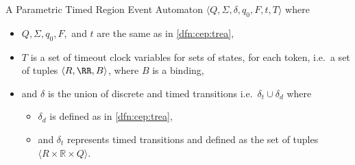 %			
			
			
			\begin{dfn}
				\label{dfn:cep:ptrea}
				A Parametric Timed Region Event Automaton $\langle Q,\Sigma,\delta,q_0, F, t, T \rangle$ where
				\begin{itemize}
					\item $Q, \Sigma, q_0, F,$ and  $t$ are the same as in \cref{dfn:cep:trea},
					\item $T$ is a set of timeout clock variables for sets of states, for each token, i.e.~a set of tuples $\langle R, \RR, B \rangle$, where $B$ is a binding,
					\item and $\delta$ is the union of discrete and timed transitions i.e.~$\delta_t \cup \delta_d$ where
					\begin{itemize}
						\item $\delta_d$ is defined as in \cref{dfn:cep:trea},
						\item and $\delta_t$ represents timed transitions and defined as the set of tuples $\langle R \times \mathbb{R} \times Q \rangle$.
					\end{itemize}
				\end{itemize}
			\end{dfn}
			
